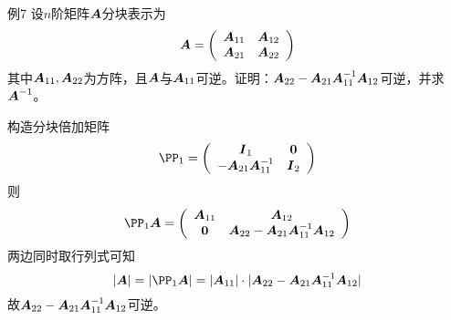 \begin{frame}
  \begin{footnotesize}
    \begin{exampleblock}{例7}
      设$n$阶矩阵$\boldsymbol{A}$分块表示为
      $$
      \boldsymbol{A} = \left(
      \begin{array}{cc}
        \boldsymbol{A}_{11} & \boldsymbol{A}_{12}\\
        \boldsymbol{A}_{21} & \boldsymbol{A}_{22}
      \end{array}
      \right)
      $$
      其中$\boldsymbol{A}_{11},\boldsymbol{A}_{22}$为方阵，且$\boldsymbol{A}$与$\boldsymbol{A}_{11}$可逆。证明：$\boldsymbol{A}_{22}-\boldsymbol{A}_{21}\boldsymbol{A}_{11}^{-1}\boldsymbol{A}_{12}$可逆，并求$\boldsymbol{A}^{-1}$。
    \end{exampleblock}
    \pause
    \jiename
    构造分块倍加矩阵
    $$
    \PP_1 = \left(
    \begin{array}{cc}
      \II_1 & \zero\\
      -\A_{21}\A_{11}^{-1} & \II_2
    \end{array}
    \right)
    $$
    则$$
    \PP_1\A = \left(
    \begin{array}{cc}
      \A_{11} & \A_{12} \\
      \zero & \A_{22}-\A_{21}\A_{11}^{-1}\A_{12}
    \end{array}
    \right)
    $$
    两边同时取行列式可知
    $$
    |\A| = |\PP_1\A| = |\A_{11}|\cdot |\A_{22}-\A_{21}\A_{11}^{-1}\A_{12}|
    $$
    故$\boldsymbol{A}_{22}-\boldsymbol{A}_{21}\boldsymbol{A}_{11}^{-1}\boldsymbol{A}_{12}$可逆。
  \end{footnotesize}
\end{frame}

